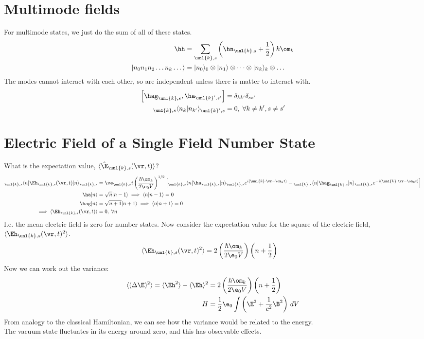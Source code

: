 \documentclass[a4paper, 11pt, normalem]{report}
\begin{document}
\section{Multimode fields}
For multimode states, we just do the sum of all of these states. 
\begin{align}
    \hh &= \sum_{\unl{k},s} \left(\hn_{\unl{k},s} + \frac12\right)\hbar\om_k \\
    |n_0n_1n_2\dots n_k\dots\rangle &= |n_0\rangle_0\otimes|n_1\rangle\otimes\dots\otimes|n_k\rangle_k\otimes\dots
\end{align}
The modes cannot interact with each other, so are independent unless there is matter to interact with.
\begin{align}
    \left[\hag_{\unl{k},s},\ha_{\unl{k}',s'}\right] &= \delta_{kk'}\delta_{ss'} \\
    {}_{\unl{k},s}\langle n_k|n_{k'}\rangle_{\unl{k}',s} &= 0,\; \forall k\neq k', s\neq s'
\end{align}

\section{Electric Field of a Single Field Number State}
What is the expectation value, $\langle\hat{\E}_{\unl{k},s}(\vr,t)\rangle$?
\begin{align}
    {}_{\unl{k},s}\langle n|\Eh_{\unl{k},s}(\vr,t)|n\rangle_{\unl{k},s} &= \ve_{\unl{k},s}i\left(\frac{\hbar\om_k}{2\e_0 V}\right)^{1/2}\left[{}_{\unl{k},s}\langle n|\ha_{\unl{k},s}|n\rangle_{\unl{k},s}e^{i(\unl{k}\cdot\vr-\om_k t)} - {}_{\unl{k},s}\langle n|\hag_{\unl{k},s}|n\rangle_{\unl{k},s}e^{-i(\unl{k}\cdot\vr-\om_kt)}\right] \\
    \ha|n\rangle &= \sqrt{n}|n-1\rangle \implies \langle n|n-1\rangle = 0 \\
    \hag|n\rangle &= \sqrt{n+1}|n+1\rangle \implies \langle n|n+1\rangle = 0 \\
    \implies \langle\Eh_{\unl{k},s}(\vr,t)\rangle &= 0,\; \forall n
\end{align}
I.e. the mean electric field is zero for number states.
Now consider the expectation value for the square of the electric field, $\langle \Eh_{\unl{k},s}(\vr,t)^2\rangle$.
\begin{align}
    \langle \Eh_{\unl{k},s}(\vr,t)^2\rangle &= 2\left(\frac{\hbar\om_k}{2\e_0V}\right)\left(n+\frac12\right)
\end{align}
Now we can work out the variance:
\begin{align}
    \langle(\Delta\E)^2\rangle = \langle\Eh^2\rangle - \langle\Eh\rangle^2 &= 2\left(\frac{\hbar\om_k}{2\e_0V}\right)\left(n+\frac12\right) \\
    H &= \frac12\e_0 \int \left(\E^2+\frac{1}{c^2}\B^2\right)\,dV
\end{align}
From analogy to the classical Hamiltonian, we can see how the variance would be related to the energy. \\
The vacuum state fluctuates in its energy around zero, and this has observable effects.
\end{document}
